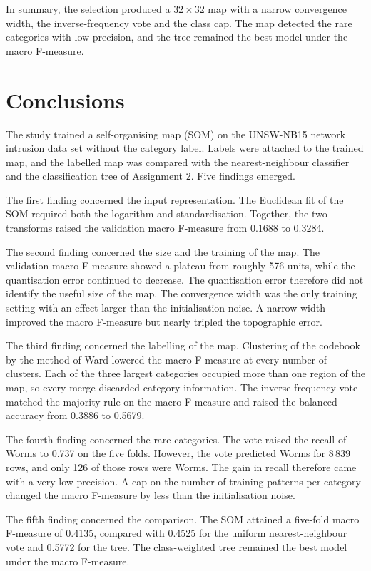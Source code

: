 \documentclass[conference,10pt]{IEEEtran}
\begin{document}
In summary, the selection produced a $32\times32$ map with a narrow convergence width, the inverse-frequency vote and the class cap.
The map detected the rare categories with low precision, and the tree remained the best model under the macro F-measure.

\section{Conclusions}
\label{sec:conclusions}
The study trained a self-organising map (SOM) on the UNSW-NB15 network intrusion data set without the category label.
Labels were attached to the trained map, and the labelled map was compared with the nearest-neighbour classifier and the classification tree of Assignment 2.
Five findings emerged.

The first finding concerned the input representation.
The Euclidean fit of the SOM required both the logarithm and standardisation.
Together, the two transforms raised the validation macro F-measure from 0.1688 to 0.3284.

The second finding concerned the size and the training of the map.
The validation macro F-measure showed a plateau from roughly 576 units, while the quantisation error continued to decrease.
The quantisation error therefore did not identify the useful size of the map.
The convergence width was the only training setting with an effect larger than the initialisation noise.
A narrow width improved the macro F-measure but nearly tripled the topographic error.

The third finding concerned the labelling of the map.
Clustering of the codebook by the method of Ward lowered the macro F-measure at every number of clusters.
Each of the three largest categories occupied more than one region of the map, so every merge discarded category information.
The inverse-frequency vote matched the majority rule on the macro F-measure and raised the balanced accuracy from 0.3886 to 0.5679.

The fourth finding concerned the rare categories.
The vote raised the recall of Worms to 0.737 on the five folds.
However, the vote predicted Worms for 8\,839 rows, and only 126 of those rows were Worms.
The gain in recall therefore came with a very low precision.
A cap on the number of training patterns per category changed the macro F-measure by less than the initialisation noise.

The fifth finding concerned the comparison.
The SOM attained a five-fold macro F-measure of 0.4135, compared with 0.4525 for the uniform nearest-neighbour vote and 0.5772 for the tree.
The class-weighted tree remained the best model under the macro F-measure.
\end{document}
